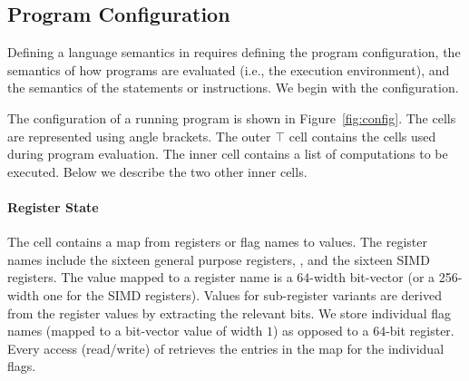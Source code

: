


\subsection{Program Configuration}\label{sec:x86sema}



Defining a language semantics in \K requires defining the program configuration, the semantics of how programs are evaluated (i.e., the execution environment), and the semantics of the statements or instructions.  We begin with the configuration.

The \K configuration of a running \ISA program is shown in Figure~\ref{fig:config}. The cells are represented using angle brackets. The outer $\top$ cell contains the cells used during program evaluation. The inner  cell contains a list of computations to be executed. Below we describe the two other inner cells.

\paragraph{Register State}

The  cell contains a  map from registers or flag names to values. The register names include the sixteen general purpose registers, , and the sixteen SIMD registers.  The value mapped to a register name is a $64$-width bit-vector (or a 256-width one for the SIMD registers). Values for sub-register variants are derived from the register values by extracting the relevant bits. We store individual flag names (mapped to a bit-vector value of width $1$) as opposed to a $64$-bit  register. Every access (read/write) of  retrieves the entries in the  map for the individual flags.

